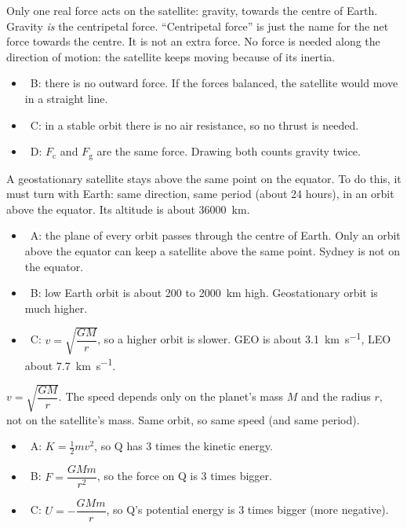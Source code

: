 \begin{practiceanswers}[Worked answers]
\begin{practiceans}
  Only one real force acts on the satellite: gravity, towards the centre of Earth. Gravity
  \emph{is} the centripetal force. “Centripetal force” is just the name for the net force
  towards the centre. It is not an extra force. No force is needed along the direction of motion:
  the satellite keeps moving because of its inertia.
  \begin{itemize}
    \item \xmark\ B: there is no outward force. If the forces balanced, the satellite would move in a
          straight line.
    \item \xmark\ C: in a stable orbit there is no air resistance, so no thrust is needed.
    \item \xmark\ D: $F_\mathrm{c}$ and $F_\mathrm{g}$ are the same force. Drawing both counts gravity
          twice.
  \end{itemize}
\end{practiceans}

\begin{practiceans}
  A geostationary satellite stays above the same point on the equator. To do this, it must turn
  with Earth: same direction, same period (about 24 hours), in an orbit above the equator. Its
  altitude is about \qty{36000}{km}.
  \begin{itemize}
    \item \xmark\ A: the plane of every orbit passes through the centre of Earth. Only an orbit
          above the equator can keep a satellite above the same point. Sydney is not on the
          equator.
    \item \xmark\ B: low Earth orbit is about 200 to \qty{2000}{km} high. Geostationary orbit is
          much higher.
    \item \xmark\ C: $v = \sqrt{\dfrac{GM}{r}}$, so a higher orbit is slower. GEO is about
          \qty{3.1}{km.s^{-1}}, LEO about \qty{7.7}{km.s^{-1}}.
  \end{itemize}
\end{practiceans}

\begin{practiceans}
  $v = \sqrt{\dfrac{GM}{r}}$. The speed depends only on the planet's mass $M$ and the radius $r$,
  not on the satellite's mass. Same orbit, so same speed (and same period).
  \begin{itemize}
    \item \xmark\ A: $K = \frac{1}{2}mv^2$, so Q has 3 times the kinetic energy.
    \item \xmark\ B: $F = \dfrac{GMm}{r^2}$, so the force on Q is 3 times bigger.
    \item \xmark\ C: $U = -\dfrac{GMm}{r}$, so Q's potential energy is 3 times bigger (more negative).
  \end{itemize}
\end{practiceans}


\end{practiceanswers}
